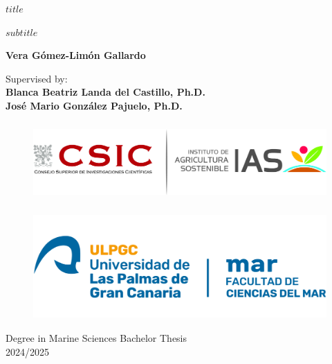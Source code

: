 %
%
%
% 


\begin{center}
    \Huge
    \textbf{$title$}
        
    \vspace{0.5cm}
    \LARGE
    \textit{$subtitle$}
        
    \vspace{0.5cm}
    \textbf{Vera Gómez-Limón Gallardo}
        
    \vspace{0.5cm}
    \Large
    Supervised by:\\
    \textbf{Blanca Beatriz Landa del Castillo, Ph.D.\\José Mario González Pajuelo, Ph.D.}
        
    \vspace{0.5cm}
    \begin{figure}[h]
      \centering
      \includegraphics[height=3cm]{images/logo-ias-csic.jpg}
    \end{figure}
    \begin{figure}[h]
      \centering
      \includegraphics[height=4cm]{images/logo-ulpgc.png}
    \end{figure}
    
    \vfill
    Degree in Marine Sciences Bachelor Thesis\\2024/2025
        
\end{center}
	
	